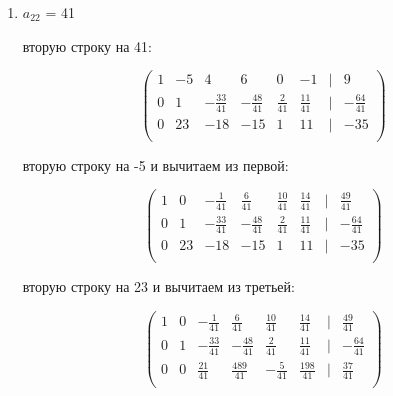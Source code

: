 \documentclass{report}
\begin{document}
\begin{itemize}
\begin{enumerate}
\begin{itemize}
		\end{itemize}
		
		\newpage
		
		\item{$a_{22}$ = 41}
		
		\begin{itemize}
			 вторую строку на 41:
			
			\begin{center}
				\Large{
					\[
					\begin{pmatrix}
						1 & -5 & 4 & 6 & 0 & -1 & | & 9 \\
						0 & 1 & -\frac{33}{41} & -\frac{48}{41} & \frac{2}{41} & \frac{11}{41} & | & -\frac{64}{41} \\
						0 & 23 & -18 & -15 & 1 & 11 & | & -35 \\
					\end{pmatrix}
					\]
				}
			\end{center}
			
			 вторую строку на -5 и вычитаем из первой:
			
			\begin{center}
				\Large{
					\[
					\begin{pmatrix}
						1 & 0 & -\frac{1}{41} & \frac{6}{41} & \frac{10}{41} & \frac{14}{41} & | & \frac{49}{41} \\
						0 & 1 & -\frac{33}{41} & -\frac{48}{41} & \frac{2}{41} & \frac{11}{41} & | & -\frac{64}{41} \\
						0 & 23 & -18 & -15 & 1 & 11 & | & -35 \\
					\end{pmatrix}
					\]
				}
			\end{center}
			
			 вторую строку на 23 и вычитаем из третьей:
			
			\begin{center}
				\Large{
					\[
					\begin{pmatrix}
						1 & 0 & -\frac{1}{41} & \frac{6}{41} & \frac{10}{41} & \frac{14}{41} & | & \frac{49}{41} \\
						0 & 1 & -\frac{33}{41} & -\frac{48}{41} & \frac{2}{41} & \frac{11}{41} & | & -\frac{64}{41} \\
						0 & 0 & \frac{21}{41} & \frac{489}{41} & -\frac{5}{41} & \frac{198}{41} & | & \frac{37}{41} \\
					\end{pmatrix}
					\]
				}
			\end{center}
			

\end{itemize}
\end{enumerate}
\end{itemize}
\end{document}
